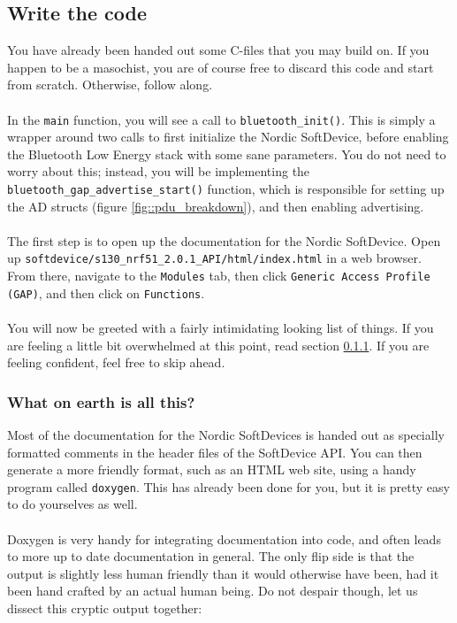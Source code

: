 \documentclass[11pt,a4paper]{article}
\begin{document}
\subsection{Write the code}
You have already been handed out some C-files that you may build on. If you happen to be a masochist, you are of course free to discard this code and start from scratch. Otherwise, follow along.\\
\\
In the \texttt{main} function, you will see a call to \texttt{bluetooth_init()}. This is simply a wrapper around two calls to first initialize the Nordic SoftDevice, before enabling the Bluetooth Low Energy stack with some sane parameters. You do not need to worry about this; instead, you will be implementing the \texttt{bluetooth_gap_advertise_start()} function, which is responsible for setting up the AD structs (figure \ref{fig::pdu_breakdown}), and then enabling advertising.\\
\\
The first step is to open up the documentation for the Nordic SoftDevice. Open up \texttt{softdevice/s130_nrf51_2.0.1_API/html/index.html} in a web browser. From there, navigate to the \texttt{Modules} tab, then click \texttt{Generic Access Profile (GAP)}, and then click on \texttt{Functions}.\\
\\
You will now be greeted with a fairly intimidating looking list of things. If you are feeling a little bit overwhelmed at this point, read section \ref{sec::what_on_earth}. If you are feeling confident, feel free to skip ahead.

\subsubsection{What on earth is all this?}
\label{sec::what_on_earth}
Most of the documentation for the Nordic SoftDevices is handed out as specially formatted comments in the header files of the SoftDevice API. You can then generate a more friendly format, such as an HTML web site, using a handy program called \texttt{doxygen}. This has already been done for you, but it is pretty easy to do yourselves as well.\\
\\
Doxygen is very handy for integrating documentation into code, and often leads to more up to date documentation in general. The only flip side is that the output is slightly less human friendly than it would otherwise have been, had it been hand crafted by an actual human being. Do not despair though, let us dissect this cryptic output together:
\end{document}
